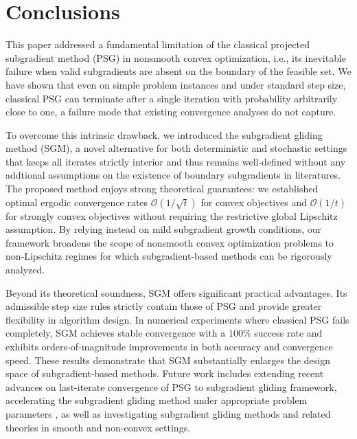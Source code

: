 \documentclass[sn-mathphys]{JORSC-jnl}%
\theoremstyle{thmstyleone}%
\theoremstyle{thmstylethree}%
\begin{document}
	
\section{Conclusions}
This paper addressed a fundamental limitation of the classical projected subgradient  method (PSG) in nonsmooth convex optimization, i.e., its inevitable failure when valid subgradients are absent on the boundary of the feasible set. We have shown that even on simple problem instances and under standard step size, classical PSG can terminate after a single iteration with probability arbitrarily close to one, a failure mode that existing convergence analyses do not capture.

To overcome this intrinsic drawback, we introduced the subgradient gliding method (SGM), a novel alternative for both deterministic and stochastic settings that keeps all iterates strictly interior and thus remains well‑defined without any addtional assumptions on the existence of boundary subgradients in literatures. The proposed method enjoys strong theoretical guarantees: we established optimal ergodic convergence rates $\mathcal{O}(1/\sqrt{t})$ for convex objectives and $\mathcal{O}(1/t)$ for strongly convex objectives without requiring the restrictive global Lipschitz assumption. By relying instead on mild subgradient growth conditions, our framework broadens the scope of nonsmooth convex optimization problems to non‑Lipschitz regimes for which subgradient-based methods can be rigorously analyzed. 

Beyond its theoretical soundness, SGM offers significant practical advantages. Its admissible step size rules strictly contain those of PSG and provide greater flexibility in algorithm design. In numerical experiments where classical PSG fails completely, SGM achieves stable convergence with a $100\%$ success rate and exhibits orders‑of‑magnitude improvements in both accuracy and convergence speed. These results demonstrate that SGM substantially enlarges the design space of subgradient‑based methods. Future work includes extending recent advances on last-iterate convergence of PSG \cite{zamani2025exact} to subgradient gliding framework, accelerating the subgradient gliding method under appropriate problem parameters \cite{johnstone2020faster}, as well as investigating subgradient gliding methods and related theories in smooth and non‑convex settings.

\end{document}
